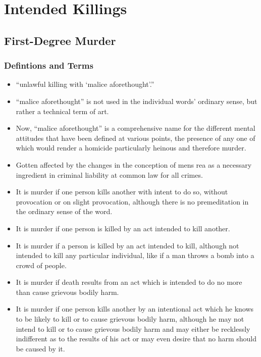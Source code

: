\documentclass[11pt]{tex/lawoutline}
\begin{document}
\chapter{Intended Killings}
\section{First-Degree Murder}

\subsection{Defintions and Terms}

{
\begin{itemize}
    \item ``unlawful killing with `malice aforethought'.'' 
    \item ``malice aforethought'' is not used in the individual words' ordinary sense, but rather a technical term of art. 
    \item Now, ``malice aforethought'' is a comprehensive name for the different mental attitudes that have been defined at various points, the presence of any one of which would render a homicide particularly heinous and therefore murder. 
    \item Gotten affected by the changes in the conception of mens rea as a necessary ingredient in criminal liability at common law for all crimes.
\end{itemize}
}

{
\begin{itemize}
    \item It is murder if one person kills another with intent to do so, without provocation or on slight provocation, although there is no premeditation in the ordinary sense of the word.
    \item It is murder if one person is killed by an act intended to kill another.
    \item It is murder if a person is killed by an act intended to kill, although not intended to kill any particular individual, like if a man throws a bomb into a crowd of people.
    \item It is murder if death results from an act which is intended to do no more than cause grievous bodily harm. 
    \item It is murder if one person kills another by an intentional act which he knows to be likely to kill or to cause grievous bodily harm, although he may not intend to kill or to cause grievous bodily harm and may either be recklessly indifferent as to the results of his act or may even desire that no harm should be caused by it.
\end{itemize}
}
\end{document}
